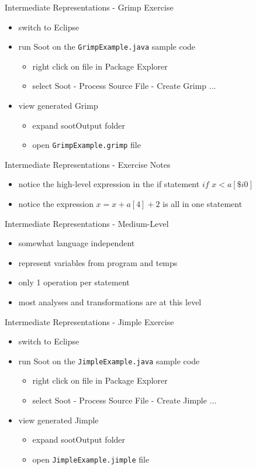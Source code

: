 \documentclass[mcgill,slideColor,colorBG,pdf]{prosper}
\begin{document}
\begin{slide} {Intermediate Representations - Grimp Exercise}
\begin{itemize}
\item switch to Eclipse
\item run Soot on the \texttt{GrimpExample.java} sample code
\begin{itemize}
\item right click on file in Package Explorer
\item select Soot - Process Source File - Create Grimp ...
\end{itemize}
\item view generated Grimp
\begin{itemize}
\item expand sootOutput folder
\item open \texttt{GrimpExample.grimp} file
\end{itemize}
\end{itemize}
\end{slide}

\begin{slide} {Intermediate Representations - Exercise Notes}
\begin{itemize}
\item notice the high-level expression in the if statement $if$ $x <a[\$i0]$
\item notice the expression $x = x + a[4] + 2$ is all in one statement
\end{itemize}
\end{slide}

\begin{slide} {Intermediate Representations - Medium-Level}
\begin{itemize}
\item somewhat language independent
\item represent variables from program and temps
\item only 1 operation per statement
\item most analyses and transformations are at this level
\end{itemize}
\end{slide}

\begin{slide} {Intermediate Representations - Jimple Exercise}
\begin{itemize}
\item switch to Eclipse
\item run Soot on the \texttt{JimpleExample.java} sample code
\begin{itemize}
\item right click on file in Package Explorer
\item select Soot - Process Source File - Create Jimple ...
\end{itemize}
\item view generated Jimple
\begin{itemize}
\item expand sootOutput folder
\item open \texttt{JimpleExample.jimple} file
\end{itemize}
\end{itemize}
\end{slide}
\end{document}
